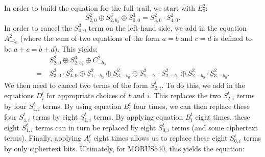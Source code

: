 \documentclass{llncs}
\newcommand{\cipher}[1]{\textsf{#1}}
\begin{document}
In order to build the equation for the full trail, we start with $E^2_0$:
\[
S^2_{2,0} \oplus S^{3}_{2,b_2} \oplus S^{3}_{0,0} = S^2_{3,0} \cdot S^2_{4,0}.
\]
In order to cancel the $S^{3}_{0,0}$ term on the left-hand side, we add in the equation $A^2_{-b_0}$ (where the sum of two equations of the form $a = b$ and $c = d$ is defined to be $a+c = b+d$). This yields:
\begin{align*}
&S^2_{2,0} \oplus S^3_{2,b_2} \oplus C^2_{-b_0}\\
=\; &S^2_{3,0} \cdot S^2_{4,0} \oplus S^2_{1,-b_0} \oplus S^2_{3,-b_0} \oplus S^2_{1,-b_0} \cdot S^2_{2,-b_0} \oplus S^2_{2,-b_0} \cdot S^2_{3,-b_0}.
\end{align*}
We then need to cancel two terms of the form $S^t_{2,i}$. To do this, we add in the equations $D^t_i$ for appropriate choices of $t$ and $i$. This replaces the two $S^t_{2,i}$ terms by four $S^t_{4,i}$ terms. By using equation $B^t_i$ four times, we can then replace these four $S^t_{4,i}$ terms by eight $S^t_{1,i}$ terms. By applying equation $B^t_i$ eight times, these eight $S^t_{1,i}$ terms can in turn be replaced by eight $S^t_{0,i}$ terms (and some ciphertext terms). Finally, applying $A^t_i$ eight times allows us to replace these eight $S^t_{0,i}$ terms by only ciphertext bits. Ultimately, for \cipher{MORUS640}, this yields the equation:
\end{document}
